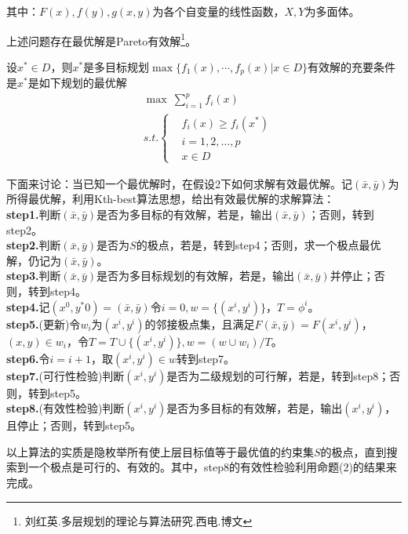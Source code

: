     其中：$F(x),f(y),g(x,y)$为各个自变量的线性函数，$X,Y$为多面体。
    \begin{proposition}[1]
    上述问题存在最优解是Pareto有效解\footnote{刘红英.多层规划的理论与算法研究.西电.博文}。
    \end{proposition}
    \begin{proposition}[2]
    设$x^*\in D$，则$x^*$是多目标规划$\max\{f_1(x),\cdots,f_p(x)|x \in D\}$有效解的充要条件是$x^*$是如下规划的最优解
    \begin{align*}
         &\mathop{\max}\ \mathop{\sum}\limits_{i=1}^pf_i(x)\\
        &s.t.\left\{
        \begin{aligned}
        & f_i(x)\geqslant f_i(x^*)\\
        & i=1,2,\ldots,p\\
        & x\in D
        \end{aligned}
            \right.
    \end{align*}
    \end{proposition}
    \par
    下面来讨论：当已知一个最优解时，在假设2下如何求解有效最优解。记$(\bar{x},\bar{y})$为所得最优解，利用Kth-best算法思想，给出有效最优解的求解算法：\\
    \textbf{step1.}判断$(\bar{x},\bar{y})$是否为多目标的有效解，若是，输出$(\bar{x},\bar{y})$；否则，转到step2。\\
    \textbf{step2.}判断$(\bar{x},\bar{y})$是否为$S$的极点，若是，转到step4；否则，求一个极点最优解，仍记为$(\bar{x},\bar{y})$。\\
    \textbf{step3.}判断$(\bar{x},\bar{y})$是否为多目标规划的有效解，若是，输出$(\bar{x},\bar{y})$并停止；否则，转到step4。\\
    \textbf{step4.}记$(x^0,y^*0)=(\bar{x},\bar{y})$令$i=0,w=\{(x^i,y^i)\}$，$T={\phi}^i$。\\
    \textbf{step5.}(更新)令$w_i$为$(x^i,y^i)$的邻接极点集，且满足$F(\bar{x},\bar{y})=F(x^i,y^i)$，$(x,y)\in w_i$，令$T=T\cup \{(x^i,y^i)\},w=(w\cup w_i)/T$。\\
    \textbf{step6.}令$i=i+1$，取$(x^i,y^i)\in w$转到step7。\\
    \textbf{step7.}(可行性检验)判断$(x^i,y^i)$是否为二级规划的可行解，若是，转到step8；否则，转到step5。\\
    \textbf{step8.}(有效性检验)判断$(x^i,y^i)$是否为多目标的有效解，若是，输出$({x^i},y^i)$，且停止；否则，转到step5。
    \par
    以上算法的实质是隐枚举所有使上层目标值等于最优值的约束集$S$的极点，直到搜索到一个极点是可行的、有效的。其中，step8的有效性检验利用命题(2)的结果来完成。
